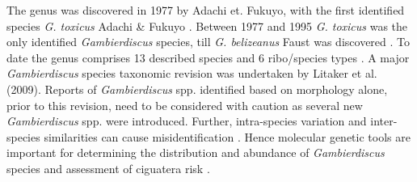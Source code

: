 \documentclass[12pt]{article}
\begin{document}
The genus was discovered in 1977 by Adachi et. Fukuyo, with the first identified species \emph{G. toxicus} Adachi \& Fukuyo \citep{adachi1979thecal}. Between 1977 and 1995 \emph{G. toxicus} was the only identified \emph{Gambierdiscus} species, till \emph{G. belizeanus} Faust was discovered \citep{faust1995observation}. To date the genus comprises 13 described species and 6 ribo/species types
 \citep{smith2016new,fraga2016gambierdiscus,litaker2010global,adachi1979thecal,faust1995observation,chinain1999morphology,litaker2009taxonomy,nishimura2014morphology,kretzschmar2016characterization,fraga2011gambierdiscus,xu2014distribution,fraga2014genus} .
A major \emph{Gambierdiscus} species taxonomic revision was undertaken by Litaker et al. (2009). Reports of \emph{Gambierdiscus} spp. identified based on morphology alone, prior to this revision, need to be considered with caution as several new \emph{Gambierdiscus} spp. were introduced. Further, intra-species variation and inter-species similarities can cause misidentification \citep{bravo2014cellular,kretzschmar2016characterization,kohli2014high}. Hence molecular genetic tools are important for determining the distribution and abundance of  \textit{Gambierdiscus} species  and assessment of ciguatera risk \citep{kohli2014high,kretzschmar2016characterization}. \\
\end{document}
